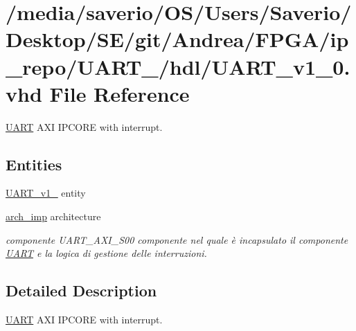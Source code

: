 \hypertarget{UART__v1__0_8vhd}{}\section{/media/saverio/\+O\+S/\+Users/\+Saverio/\+Desktop/\+S\+E/git/\+Andrea/\+F\+P\+G\+A/ip\+\_\+repo/\+U\+A\+R\+T\+\_/hdl/\+U\+A\+R\+T\+\_\+v1\+\_\+0.vhd File Reference}
\label{UART__v1__0_8vhd}


\hyperlink{structUART}{U\+A\+RT} A\+XI I\+P\+C\+O\+RE with interrupt.  


\subsection*{Entities}
\begin{DoxyCompactItemize}
\item 
\hyperlink{classUART__v1__0}{U\+A\+R\+T\+\_\+v1\+\_} entity
\item 
\hyperlink{classUART__v1__0_1_1arch__imp}{arch\+\_\+imp} architecture
\begin{DoxyCompactList}\small\item\em componente U\+A\+R\+T\+\_\+\+A\+X\+I\+\_\+\+S00  componente nel quale è incapsulato il componente \hyperlink{structUART}{U\+A\+RT} e la logica di gestione delle interruzioni. \end{DoxyCompactList}\end{DoxyCompactItemize}


\subsection{Detailed Description}
\hyperlink{structUART}{U\+A\+RT} A\+XI I\+P\+C\+O\+RE with interrupt. 

